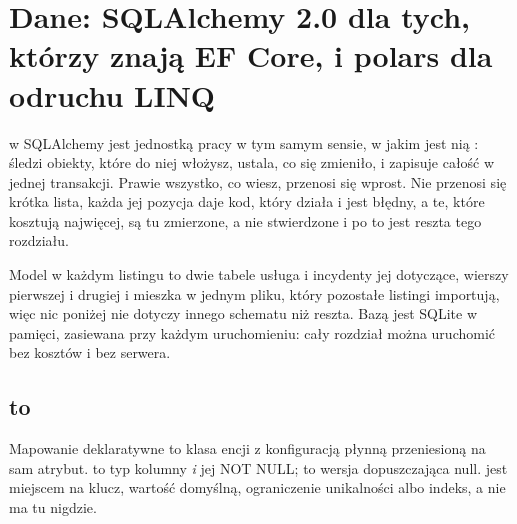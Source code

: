 
\chapter{Dane: SQLAlchemy 2.0 dla tych, którzy znają EF Core, i polars dla odruchu LINQ}
\label{ch:data}

\noindent
{} w SQLAlchemy jest jednostką pracy w tym samym sensie, w jakim
jest nią : śledzi obiekty, które do niej włożysz, ustala, co
się zmieniło, i zapisuje całość w jednej transakcji. Prawie wszystko, co
wiesz, przenosi się wprost. Nie przenosi się krótka lista, każda jej pozycja
daje kod, który działa i jest błędny, a te, które kosztują najwięcej, są tu
zmierzone, a nie stwierdzone \dash{} i po to jest reszta tego rozdziału.

Model w każdym listingu to dwie tabele \dash{} usługa i incydenty jej
dotyczące,  wierszy pierwszej i  drugiej
\dash{} i mieszka w jednym pliku, który pozostałe listingi importują, więc nic
poniżej nie dotyczy innego schematu niż reszta. Bazą
jest SQLite w pamięci, zasiewana przy każdym uruchomieniu: cały rozdział
można uruchomić bez kosztów i bez serwera.

\section{ to }
\label{sec:ch10-session}

Mapowanie deklaratywne to klasa encji z konfiguracją płynną przeniesioną na
sam atrybut.  to typ kolumny \emph{i} jej NOT NULL;
 to wersja dopuszczająca null.
 jest miejscem na klucz, wartość domyślną,
ograniczenie unikalności albo indeks, a  nie ma tu
nigdzie.


